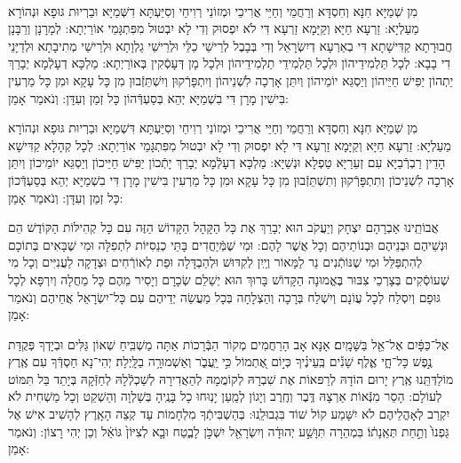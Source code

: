 \documentclass[twoside, openany, parskip=half, 11pt]{book}
\begin{document}

\shabbos\\
 מִן שְׁמַיָּא חִנָּא וְחִסְדָּא וְרַחֲמֵי וְחַיֵּי אֲרִיכֵי וּמְזוֹנֵי רְוִיחֵי וְסִיַּעְתָּא דִשְּׁמַיָּא וּבַרְיוּת גּוּפָא וּנְהוֹרָא מַעַלְיָא: זַרְעָא חַיָּא וְקַיָּמָא זַרְעָא דִּי לֹא יִפְסוּק וְדִי לָא יִבְטוּל מִפִּתְגָּמֵי אוֹרַיְתָא: לְמָרָנָן וְרַבָּנָן חֲבוּרָתָא קַדִּישָׁתָא דִּי בְאַרְעָא דְיִשְׂרָאֵל וְדִי בְּבָבֶל לְרֵישֵׁי כַלֵּי וּלְרֵישֵׁי גַלְוָתָא וּלְרֵישֵׁי מְתִיבָתָא וּלְדַיָּנֵי דִי בָבָא: לְכָל תַּלְמִידֵיהוֹן וּלְכָל תַּלְמִידֵי תַלְמִידֵיהוֹן וּלְכָל מָן דְּעָסְֿקִין בְּאוֹרַיְתָא: מַלְכָּא דְעָלְֿמָא יְבָרֵךְ יַתְהוֹן יַפִּישׁ חַיֵּיהוֹן וְיַסְגֵּא יוֹמֵיהוֹן וְיִתֵּן אָרְכָה לִשְׁנֵיהוֹן וְיִתְפָּרְֿקוּן וְיִשְׁתֵּזְֿבוּן מִן כָּל עָקָא וּמִן כָּל מַרְעִין בִּישִׁין מָרָן דִּי בִשְׁמַיָּא יְהֵא בְּסַעְדְּֿהוֹן כָּל זְמַן וְעִדָּן: וְנֹאמַר אָמֵן: 

 

 מִן שְׁמַיָּא חִנָּא וְחִסְדָּא וְרַחֲמֵי וְחַיֵּי אֲרִיכֵי וּמְזוֹנֵי רְוִיחֵי וְסִיַּעְתָּא דִּשְׁמַיָּא וּבַרְיוּת גּוּפָא וּנְהוֹרָא מַעַלְיָא: זַרְעָא חַיָּא וְקַיָּמָא זַרְעָא דִּי לָא יִפְסוּק וְדִי לָא יִבְטוּל מִפִּתְגָּמֵי אוֹרַיְתָא: לְכָל קְהָלָא קַדִּישָׁא הָדֵין רַבְרְֿבַיָּא עִם זְעֵרַיָּא טַפְלָא וּנְשַׁיָּא: מַלְכָּא דְעָלְֿמָא יְבָרֵךְ יָתְֿכוֹן יַפִּישׁ חַיֵּיכוֹן וְיַסְגֵּא יוֹמֵיכוֹן וְיִתֵּן אָרְכָה לִשְׁנֵיכוֹן וְתִתְפָּרְֿקוּן וְתִשְׁתֵּזְֿבוּן מִן כָּל עָקָא וּמִן כָּל מַרְעִין בִּישִׁין מָרָן דִּי בִשְׁמַיָּא יְהֵא בְּסַעְדְּֿכוֹן כָּל זְמַן וְעִדָּן: וְנֹאמַר אָמֵן: 

 אֲבוֹתֵֽינוּ אַבְרָהָם יִצְחָק וְיַעֲקֹב הוּא יְבָרֵךְ אֶת כָּל הַקָּהָל הַקָּדוֹשׁ הַזֶּה עִם כָּל קְהִילּוֹת הַקּוֹדֶשׁ הֵם וּנְשֵׁיהֶם וּבְנֵיהֶם וּבְנוֹתֵיהֶם וְכָל אֲשֶׁר לָהֶם: וּמִי שֶׁמְּֿיַחֲדִים בָּתֵּי כְנֵסִיּוֹת לִתְפִלָּה וּמִי שֶׁבָּאִים בְּתוֹכָם לְהִתְפַּלֵּל וּמִי שֶׁנּוֹתְֿנִים נֵר לַמָּאוֹר וְיַֽיִן לְקִדּוּשׁ וּלְהַבְדָּלָה וּפַת לְאוֹרְֿחִים וּצְדָקָה לַעֲנִיִּים וְכָל מִי שֶׁעוֹסְֿקִים בְּצָרְכֵי צִבּוּר בֶּאֱמוּנָה הַקָּדוֹשׁ בָּרוּךְ הוּא יְשַׁלֵם שְׂכָרָם וְיָסִיר מֵהֶם כָּל מַחֲלָה וְיִרְפָּא לְכָל גּוּפָם וְיִסְלַח לְכָל עֲוֹנָם וְיִשְׁלַח בְּרָכָה וְהַצְלָחָה בְּכָל מַעֲשֵׂה יְדֵיהֶם עִם כָּל־יִשְׂרָאֵל אֲחֵיהֶם וְנֹאמַר אָמֵן:





אֶל־כַּפָּ֔יִם אֶל־אֵ֖ל בַּשָּׁמָֽיִם׃ אָנָּא אָב הָרַחֲמִים מְקוֹר הַבְּֿרָכוֹת אַתָּה מַשְׁבִּֽיחַ שְׁאוֹן גַּלִּים וּבְיָדְךָ פְּקֻדַּת נֶ֣פֶשׁ כָּל־חָ֑י אֶ֢לֶף שָׁנִ֡ים בְּֽעֵינֶ֗יךָ כְּי֣וֹם אֶ֭תְמוֹל כִּ֣י יַֽעֲבֹ֑ר וְאַשְׁמוּרָ֥ה בַלָּֽיְלָה׃ יְהִי־נָא חַסְדְּֿךָ עִם אֶֽרֶץ מוֹלַדְּתֵּֽנוּ אֶֽרֶץ
 יָרוּם הוֹדָהּ לְרַפּאוֹת אֶת שִׁבְרָהּ לְקוֹמֲמָהּ לְהַאֲדִירָהּ לְשַׁכְלְֿלָהּ לְחַזְּֿקָהּ בְּיָתֵד בַּל תִּמּוֹט לְעוֹלָם: הָסֵר מִנְּֿאוֹת אַרְצָהּ דֶּֽבֶר וְחֶֽרֶב וְיָגוֹן לְמַֽעַן יָנֽוּחוּ כָל בָּנֶֽיהָ בְּשַׁלְוָה וְהַשְׁקֵט וְכָל מַשְׁחִית לֹא יִקְרַב לְאָהֳלֵיהֶם לֹא יִשָּׁמַע קוֹל שׁוֹד בִּגְבוּלֵֽנוּ: בְּהַשְׁבִּיתְֿךָ מִלְחָמוֹת עַד קְצֵה הָאָֽרֶץ לְהָשִׁיב אִישׁ אֶל  גַּפְנוֹ֙ וְתַ֣חַת תְּאֵֽנָת֔וֹ׃ בִּמְהֵרָה תִּוָּשַׁ֣ע יְהוּדָ֔ה וְיִשְׂרָאֵ֖ל יִשְׁכֹּ֣ן לָבֶ֑טַח וּבָ֤א לְצִיּוֹן֙ גּוֹאֵ֔ל וְכֵן יְהִי רָצוֹן: וְנֹאמַר אָמֵן:
 
\end{document}
